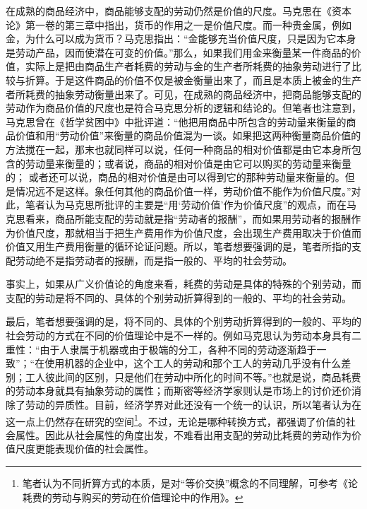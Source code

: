 在成熟的商品经济中，商品能够支配的劳动仍然是价值的尺度。马克思在《资本论》第一卷的第三章中指出，货币的作用之一是价值尺度\cite[114-124]{ZhongGongZhongYangMaKeSiEnGeSiLieNingSiDaLinZhuZuoBianYiJuMaKeSiEnGeSiWenJiDi5Juan2009}。而一种贵金属，例如金，为什么可以成为货币？马克思指出：“金能够充当价值尺度，只是因为它本身是劳动产品，因而使潜在可变的价值。”\cite[118]{ZhongGongZhongYangMaKeSiEnGeSiLieNingSiDaLinZhuZuoBianYiJuMaKeSiEnGeSiWenJiDi5Juan2009}那么，如果我们用金来衡量某一件商品的价值，实际上是把由商品生产者耗费的劳动与金的生产者所耗费的抽象劳动进行了比较与折算。于是这件商品的价值不仅是被金衡量出来了，而且是本质上被金的生产者所耗费的抽象劳动衡量出来了。可见，在成熟的商品经济中，把商品能够支配的劳动作为商品价值的尺度也是符合马克思分析的逻辑和结论的。但笔者也注意到，马克思曾在《哲学贫困中》中批评道：“他把用商品中所包含的劳动量来衡量的商品价值和用“劳动价值”来衡量的商品价值混为一谈。如果把这两种衡量商品价值的方法搅在一起，那末也就同样可以说，任何一种商品的相对价值都是由它本身所包含的劳动量来衡量的；或者说，商品的相对价值是由它可以购买的劳动量来衡量的； 或者还可以说，商品的相对价值是由可以得到它的那种劳动量来衡量的。但是情况远不是这样。象任何其他的商品价值一样，劳动价值不能作为价值尺度。”\cite[97]{ZhongGongZhongYangMaKeSiEnGeSiLieNingSiDaLinZhuZuoBianYiJuMaKeSiEnGeSiQuanJiDi4Juan1958}对此，笔者认为马克思所批评的主要是“用‘劳动价值’作为价值尺度”的观点，而在马克思看来，商品所能支配的劳动就是指“劳动者的报酬”，而如果用劳动者的报酬作为价值尺度，那就相当于把生产费用作为价值尺度，会出现生产费用取决于价值而价值又用生产费用衡量的循环论证问题\cite[98]{ZhongGongZhongYangMaKeSiEnGeSiLieNingSiDaLinZhuZuoBianYiJuMaKeSiEnGeSiQuanJiDi4Juan1958}。\cite[5]{ZhangLeiShengMaKeSiLaoDongJieZhiLunYanJiuDeLiShiZhengTiXing2015}所以，笔者想要强调的是，笔者所指的支配劳动绝不是指劳动者的报酬，而是指一般的、平均的社会劳动。

事实上，如果从广义价值论的角度来看，耗费的劳动是具体的特殊的个别劳动，而支配的劳动是将不同的、具体的个别劳动折算得到的一般的、平均的社会劳动。

最后，笔者想要强调的是，将不同的、具体的个别劳动折算得到的一般的、平均的社会劳动的方式在不同的价值理论中是不一样的。例如马克思认为劳动本身具有二重性：“由于人隶属于机器或由于极端的分工，各种不同的劳动逐渐趋于一致”\cite[96]{ZhongGongZhongYangMaKeSiEnGeSiLieNingSiDaLinZhuZuoBianYiJuMaKeSiEnGeSiQuanJiDi4Juan1958}；“在使用机器的企业中，这个工人的劳动和那个工人的劳动几乎没有什么差别；工人彼此间的区别，只是他们在劳动中所化的时间不等。”\cite[97]{ZhongGongZhongYangMaKeSiEnGeSiLieNingSiDaLinZhuZuoBianYiJuMaKeSiEnGeSiQuanJiDi4Juan1958}也就是说，商品耗费的劳动本身就具有抽象劳动的属性；而斯密等经济学家则认是市场上的讨价还价消除了劳动的异质性。目前，经济学界对此还没有一个统一的认识，所以笔者认为在这一点上仍然存在研究的空间\footnote{笔者认为不同折算方式的本质，是对“等价交换”概念的不同理解，可参考《论耗费的劳动与购买的劳动在价值理论中的作用》\cite[69]{CaiJiMingLunHaoFeiDeLaoDongYuGouMaiDeLaoDongZaiJieZhiLiLunZhongDeZuoYong2022}。}。不过，无论是哪种转换方式，都强调了价值的社会属性。因此从社会属性的角度出发，不难看出用支配的劳动比耗费的劳动作为价值尺度更能表现价值的社会属性。

